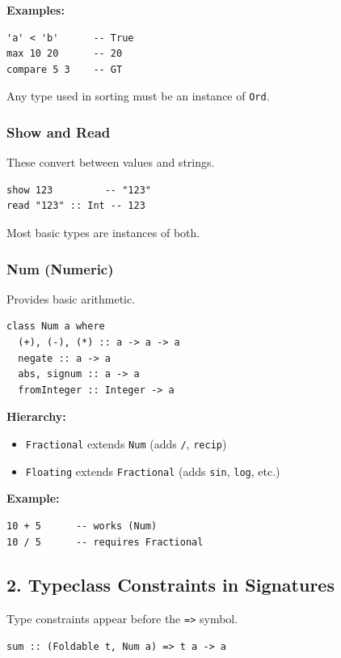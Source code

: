 \documentclass[12pt]{article}
\begin{document}
\textbf{Examples:}
\begin{verbatim}
'a' < 'b'      -- True
max 10 20      -- 20
compare 5 3    -- GT
\end{verbatim}

Any type used in sorting must be an instance of \texttt{Ord}.

\subsubsection{Show and Read}

These convert between values and strings.

\begin{verbatim}
show 123         -- "123"
read "123" :: Int -- 123
\end{verbatim}

Most basic types are instances of both.

\subsubsection{Num (Numeric)}

Provides basic arithmetic.

\begin{verbatim}
class Num a where
  (+), (-), (*) :: a -> a -> a
  negate :: a -> a
  abs, signum :: a -> a
  fromInteger :: Integer -> a
\end{verbatim}

\textbf{Hierarchy:}
\begin{itemize}
  \item \texttt{Fractional} extends \texttt{Num} (adds \texttt{/}, \texttt{recip})
  \item \texttt{Floating} extends \texttt{Fractional} (adds \texttt{sin}, \texttt{log}, etc.)
\end{itemize}

\textbf{Example:}
\begin{verbatim}
10 + 5      -- works (Num)
10 / 5      -- requires Fractional
\end{verbatim}

\subsection{2. Typeclass Constraints in Signatures}

Type constraints appear before the \texttt{=>} symbol.

\begin{verbatim}
sum :: (Foldable t, Num a) => t a -> a
\end{verbatim}
\end{document}
